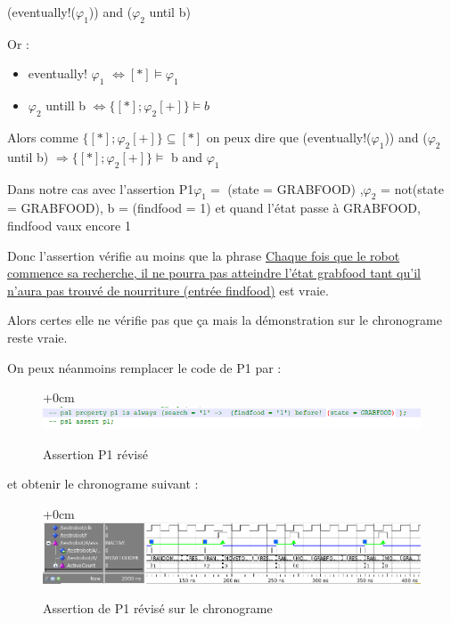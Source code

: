 \documentclass{article}
\newcommand{\sautligne}{
\textbf{\vspace{5mm}}
}
\begin{document}
(eventually!($ \varphi_1$)) and ($ \varphi_2$ until b) 

\vspace{2mm} 

Or : 
\begin{itemize}
\item eventually! $ \varphi_1$ $ \Leftrightarrow [*] \models \varphi_1 $ 
\item $ \varphi_2$ untill b $ \Leftrightarrow 
\{[*] ;  \varphi_2[+]\}\models b$
\end{itemize}

Alors comme $\{[*] ;  \varphi_2[+]\} \subseteq [*] $ on peux dire que (eventually!($ \varphi_1$)) and ($ \varphi_2$ until b) $ \Rightarrow \{[*] ;  \varphi_2[+]\}\models$ b and $\varphi_1$

\sautligne


Dans notre cas avec l'assertion P1$ \varphi_1 =$ (state = GRABFOOD) ,$ \varphi_2$ = not(state = GRABFOOD), b = (findfood = 1) et quand l'état passe à GRABFOOD, findfood vaux encore 1
\sautligne


Donc l'assertion vérifie au moins que la phrase \uline{Chaque fois que le robot commence sa recherche, il ne pourra pas atteindre l'état 
grabfood tant qu'il n'aura pas trouvé de nourriture (entrée findfood)} est vraie.

Alors certes elle ne vérifie pas que ça mais la démonstration sur le chronograme reste vraie.

On peux néanmoins remplacer le code de P1 par : 

\begin{figure}[!h]
\advance\leftskip+0cm
\includegraphics[scale=0.6]{PSL/preuveCode.PNG}
\caption{Assertion P1 révisé }
\end{figure} 

et obtenir le chronograme suivant :

\begin{figure}[!h]
\advance\leftskip+0cm
\includegraphics[scale=0.6]{PSL/preuve.PNG}
\caption{Assertion  de P1 révisé sur le chronograme }
\end{figure}
\end{document}
